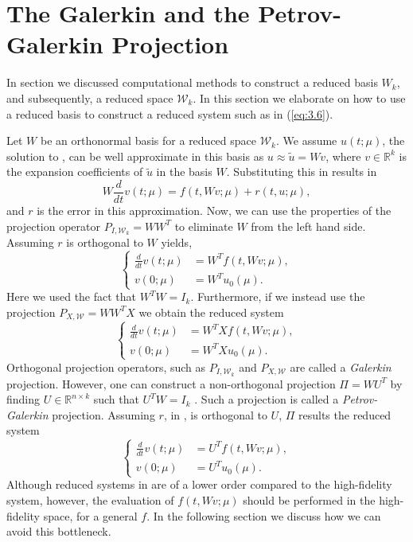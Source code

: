 \section{The Galerkin and the Petrov-Galerkin Projection} \label{sec:3.4}
In section  we discussed computational methods to construct a reduced basis $W_k$, and subsequently, a reduced space $\mathcal W_k$. In this section we elaborate on how to use a reduced basis to construct a reduced system such as in (\ref{eq:3.6}).

Let $W$ be an orthonormal basis for a reduced space $\mathcal W_k$. We assume $u(t;\mu)$, the solution to , can be well approximate in this basis as $u \approx \tilde u = W v$, where $v\in \mathbb R^{k}$ is the expansion coefficients of $\tilde u$ in the basis $W$. Substituting this in 
 results in
\begin{equation} \label{eq:3.25}
	W \frac{d}{dt} v(t;\mu) = f(t,Wv;\mu) + r(t,u;\mu),
\end{equation}
and $r$ is the error in this approximation. Now, we can use the properties of the projection operator $P_{I,\mathcal W_k} = WW^T$ to eliminate $W$ from the left hand side. Assuming $r$ is orthogonal to $W$ yields,
\begin{equation} \label{eq:3.26}
	\left\{
	\begin{aligned}
	\frac{d}{dt} v(t;\mu) &= W^T f(t,Wv;\mu), \\
	v(0;\mu) &= W^T u_0(\mu).
	\end{aligned}
	\right.
\end{equation}
Here we used the fact that $W^TW = I_k$. Furthermore, if we instead use the projection $P_{X,\mathcal W} = WW^TX$ we obtain the reduced system
\begin{equation} \label{eq:3.27}
	\left\{
	\begin{aligned}
	\frac{d}{dt} v(t;\mu) &= W^T X f(t,Wv;\mu), \\
	v(0;\mu) &= W^T X u_0(\mu).
	\end{aligned}
	\right.
\end{equation}
Orthogonal projection operators, such as $P_{I,\mathcal W_k}$ and $P_{X,\mathcal W}$ are called a \emph{Galerkin} projection. However, one can construct a non-orthogonal projection $\Pi = WU^T$ by finding $U\in \mathbb R^{n\times k}$ such that $U^TW = I_k$ \cite{hesthaven2015certified,quarteroni2015reduced,doi:10.1137/1.9780898718713}. Such a projection is called a \emph{Petrov-Galerkin} projection. Assuming $r$, in , is orthogonal to $U$, $\Pi$ results the reduced system
\begin{equation} \label{eq:3.28}
	\left\{
	\begin{aligned}
	\frac{d}{dt} v(t;\mu) &= U^T f(t,Wv;\mu), \\
	v(0;\mu) &= U^T u_0(\mu).
	\end{aligned}
	\right.
\end{equation} 
Although reduced systems in  are of a lower order compared to the high-fidelity system, however, the evaluation of $f(t,Wv;\mu)$ should be performed in the high-fidelity space, for a general $f$. In the following section we discuss how we can avoid this bottleneck. 

